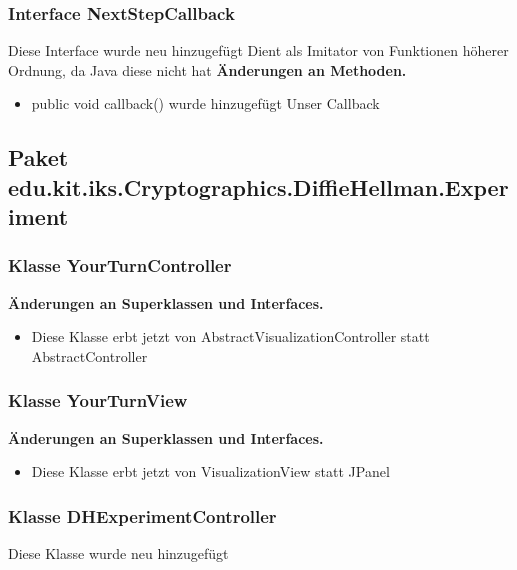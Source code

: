 \documentclass{article}
\begin{document}
	\subsubsection{Interface NextStepCallback}
    Diese Interface wurde neu hinzugefügt
    Dient als Imitator von Funktionen höherer Ordnung,
    da Java diese nicht hat
    \textbf{Änderungen an Methoden.}\newline
	   \begin{itemize}
           \item public void callback() wurde hinzugefügt\newline
               Unser Callback
           \end{itemize}

  \subsection{Paket edu.kit.iks.Cryptographics.DiffieHellman.Experiment}

	\subsubsection{Klasse YourTurnController}
	    \textbf{Änderungen an Superklassen und Interfaces.}\newline
        \begin{itemize}
            \item Diese Klasse erbt jetzt von AbstractVisualizationController statt AbstractController\newline
        \end{itemize}

	\subsubsection{Klasse YourTurnView}
	    \textbf{Änderungen an Superklassen und Interfaces.}\newline
        \begin{itemize}
            \item Diese Klasse erbt jetzt von VisualizationView statt JPanel\newline
        \end{itemize}

	\subsubsection{Klasse DHExperimentController}
    Diese Klasse wurde neu hinzugefügt
\end{document}
